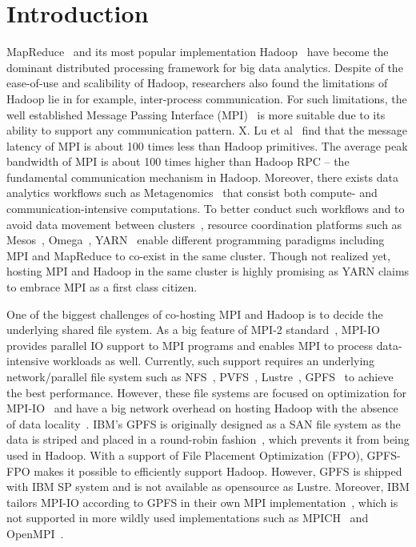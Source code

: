 \section{Introduction}
MapReduce~\cite{mr} and its most popular implementation Hadoop~\cite{hadoop}
have become the dominant distributed processing framework for big data
analytics. Despite of the ease-of-use and scalibility of Hadoop, researchers
also found the limitations of Hadoop lie in for example, inter-process
communication. For such limitations, the well established Message Passing
Interface (MPI)~\cite{mpi2012} is more suitable due to its ability to support any
communication pattern. X. Lu et al~\cite{xlu} find that  the
message latency of MPI is about 100 times less than Hadoop
primitives. The average peak bandwidth of MPI is about
100 times higher than Hadoop RPC -- the fundamental communication
mechanism in Hadoop. Moreover, there exists data analytics workflows such as
Metagenomics~\cite{meta} that consist both compute- and communication-intensive
computations. To better conduct such workflows and to avoid data
movement between clusters~\cite{catch}, resource coordination platforms such as
Mesos~\cite{mesos}, Omega~\cite{omega}, YARN~\cite{yarn2013} enable different
programming paradigms including MPI and MapReduce to co-exist in the same
cluster. Though not realized yet, hosting MPI and Hadoop in the same cluster is
highly promising as YARN claims to embrace MPI as a first class citizen.

One of the biggest challenges of co-hosting MPI and Hadoop is to decide the
underlying shared file system. As a big feature of MPI-2 standard~\cite{mpi2012},
MPI-IO provides parallel IO support to MPI programs and enables MPI to process
data-intensive workloads as well. Currently, such support requires an underlying
network/parallel file system such as NFS~\cite{nfs1}, PVFS~\cite{pvfs},
Lustre~\cite{lustre}, GPFS~\cite{gpfs} to achieve the best performance. However,
these file systems are focused on optimization for MPI-IO~\cite{mpipvfs,
mpilustre1, mpigpfs} and have a big network overhead on hosting Hadoop with the
absence of data locality~\cite{hadooplustre}. IBM's GPFS is originally designed
as a SAN file system as the data is striped and placed in a round-robin
fashion~\cite{gpfs}, which prevents it from being used in Hadoop. With a support
of File Placement Optimization (FPO), GPFS-FPO makes it possible to efficiently
support Hadoop.  However, GPFS is shipped with IBM SP system and is not
available as opensource as Lustre. Moreover, IBM tailors MPI-IO according to
GPFS in their own MPI implementation~\cite{mpigpfs}, which is not supported in
more wildly used implementations such as MPICH~\cite{mpich} and
OpenMPI~\cite{openmpi}.

